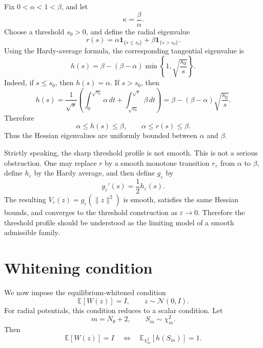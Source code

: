 \documentclass[11pt]{article}
\numberwithin{equation}{section}
\begin{document}
Fix $0<\alpha<1<\beta$, and let
\begin{equation}
    \kappa=\frac{\beta}{\alpha}.
\end{equation}
Choose a threshold $s_0>0$, and define the radial eigenvalue
\begin{equation}
    r(s)
    =
    \alpha \mathbf 1_{\{s\le s_0\}}
    +
    \beta \mathbf 1_{\{s>s_0\}}.
\end{equation}
Using the Hardy-average formula, the corresponding tangential eigenvalue is
\begin{equation}
    h(s)
    =
    \beta
    -
    (\beta-\alpha)
    \min
    \left\{
    1,\sqrt{\frac{s_0}{s}}
    \right\}.
\end{equation}
Indeed, if $s\le s_0$, then $h(s)=\alpha$. 
If $s>s_0$, then
\begin{equation}
    h(s)
    =
    \frac{1}{\sqrt{s}}
    \left(
    \int_0^{\sqrt{s_0}}\alpha\,dt
    +
    \int_{\sqrt{s_0}}^{\sqrt{s}}\beta\,dt
    \right)
    =
    \beta-(\beta-\alpha)\sqrt{\frac{s_0}{s}}.
\end{equation}
Therefore
\begin{equation}
    \alpha\le h(s)\le \beta,
    \qquad
    \alpha\le r(s)\le \beta.
\end{equation}
Thus the Hessian eigenvalues are uniformly bounded between $\alpha$ and $\beta$.

Strictly speaking, the sharp threshold profile is not smooth. 
This is not a serious obstruction. 
One may replace $r$ by a smooth monotone transition $r_\varepsilon$ from $\alpha$ to $\beta$, define $h_\varepsilon$ by the Hardy average, and then define $g_\varepsilon$ by
\begin{equation}
    g_\varepsilon'(s)=\frac12 h_\varepsilon(s).
\end{equation}
The resulting $V_\varepsilon(z)=g_\varepsilon(\|z\|^2)$ is smooth, satisfies the same Hessian bounds, and converges to the threshold construction as $\varepsilon\to 0$. 
Therefore the threshold profile should be understood as the limiting model of a smooth admissible family.

\section{Whitening condition}

We now impose the equilibrium-whitened condition
\begin{equation}
    \mathbb E[W(z)] = I,
    \qquad
    z\sim \mathcal N(0,I).
\end{equation}
For radial potentials, this condition reduces to a scalar condition. 
Let
\begin{equation}
    m=N_\theta+2,
    \qquad
    S_m\sim \chi_m^2.
\end{equation}
Then
\begin{equation}
    \mathbb E[W(z)]=I
    \quad
    \Longleftrightarrow
    \quad
    \mathbb E_{\chi_m^2}[h(S_m)] = 1.
\end{equation}
\end{document}
